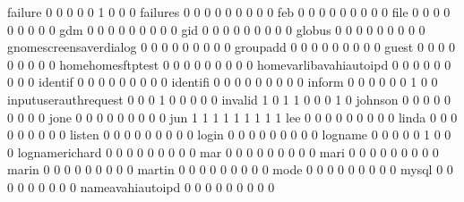 \documentclass[compress,8pt]{beamer}
\begin{document}
\begin{frame}
\begin{Schunk}
  failure                                    0   0   0   0   0   1   0   0   0
  failures                                   0   0   0   0   0   0   0   0   0
  feb                                        0   0   0   0   0   0   0   0   0
  file                                       0   0   0   0   0   0   0   0   0
  gdm                                        0   0   0   0   0   0   0   0   0
  gid                                        0   0   0   0   0   0   0   0   0
  globus                                     0   0   0   0   0   0   0   0   0
  gnomescreensaverdialog                     0   0   0   0   0   0   0   0   0
  groupadd                                   0   0   0   0   0   0   0   0   0
  guest                                      0   0   0   0   0   0   0   0   0
  homehomesftptest                           0   0   0   0   0   0   0   0   0
  homevarlibavahiautoipd                     0   0   0   0   0   0   0   0   0
  identif                                    0   0   0   0   0   0   0   0   0
  identifi                                   0   0   0   0   0   0   0   0   0
  inform                                     0   0   0   0   0   0   1   0   0
  inputuserauthrequest                       0   0   0   1   0   0   0   0   0
  invalid                                    1   0   1   1   0   0   0   1   0
  johnson                                    0   0   0   0   0   0   0   0   0
  jone                                       0   0   0   0   0   0   0   0   0
  jun                                        1   1   1   1   1   1   1   1   1
  lee                                        0   0   0   0   0   0   0   0   0
  linda                                      0   0   0   0   0   0   0   0   0
  listen                                     0   0   0   0   0   0   0   0   0
  login                                      0   0   0   0   0   0   0   0   0
  logname                                    0   0   0   0   0   1   0   0   0
  lognamerichard                             0   0   0   0   0   0   0   0   0
  mar                                        0   0   0   0   0   0   0   0   0
  mari                                       0   0   0   0   0   0   0   0   0
  marin                                      0   0   0   0   0   0   0   0   0
  martin                                     0   0   0   0   0   0   0   0   0
  mode                                       0   0   0   0   0   0   0   0   0
  mysql                                      0   0   0   0   0   0   0   0   0
  nameavahiautoipd                           0   0   0   0   0   0   0   0   0

\end{Schunk}
\end{frame}
\end{document}
